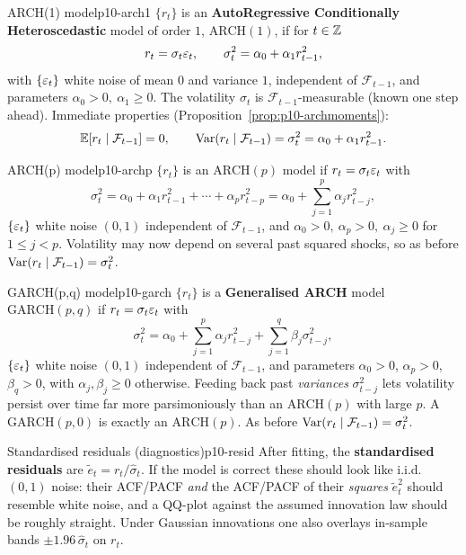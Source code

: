 \begin{definition}{ARCH(1) model}{p10-arch1}
$\{r_t\}$ is an \textbf{AutoRegressive Conditionally Heteroscedastic} model of
order $1$, $\mathrm{ARCH}(1)$, if for $t\in\mathbb{Z}$
\[
r_t=\sigma_t\varepsilon_t,\qquad \sigma_t^2=\alpha_0+\alpha_1 r_{t-1}^2,
\]
with $\{\varepsilon_t\}$ white noise of mean $0$ and variance $1$, independent of
$\mathcal F_{t-1}$, and parameters $\alpha_0>0,\ \alpha_1\ge 0$. The volatility
$\sigma_t$ is $\mathcal F_{t-1}$-measurable (known one step ahead). Immediate
properties (Proposition~\ref{prop:p10-archmoments}):
\[
\mathbb{E}[r_t\mid\mathcal F_{t-1}]=0,\qquad
\operatorname{Var}(r_t\mid\mathcal F_{t-1})=\sigma_t^2=\alpha_0+\alpha_1 r_{t-1}^2 .
\]
\end{definition}

\begin{definition}{ARCH(p) model}{p10-archp}
$\{r_t\}$ is an $\mathrm{ARCH}(p)$ model if $r_t=\sigma_t\varepsilon_t$ with
\[
\sigma_t^2=\alpha_0+\alpha_1 r_{t-1}^2+\cdots+\alpha_p r_{t-p}^2
=\alpha_0+\sum_{j=1}^{p}\alpha_j r_{t-j}^2,
\]
$\{\varepsilon_t\}$ white noise $(0,1)$ independent of $\mathcal F_{t-1}$, and
$\alpha_0>0,\ \alpha_p>0,\ \alpha_j\ge0$ for $1\le j<p$. Volatility may now
depend on several past squared shocks, so as before
$\operatorname{Var}(r_t\mid\mathcal F_{t-1})=\sigma_t^2$.
\end{definition}

\begin{definition}{GARCH(p,q) model}{p10-garch}
$\{r_t\}$ is a \textbf{Generalised ARCH} model $\mathrm{GARCH}(p,q)$ if
$r_t=\sigma_t\varepsilon_t$ with
\[
\sigma_t^2=\alpha_0+\sum_{j=1}^{p}\alpha_j r_{t-j}^2+\sum_{j=1}^{q}\beta_j\sigma_{t-j}^2,
\]
$\{\varepsilon_t\}$ white noise $(0,1)$ independent of $\mathcal F_{t-1}$, and parameters
$\alpha_0>0$, $\alpha_p>0$, $\beta_q>0$, with $\alpha_j,\beta_j\ge0$ otherwise.
Feeding back past \emph{variances} $\sigma_{t-j}^2$ lets volatility persist over
time far more parsimoniously than an $\mathrm{ARCH}(p)$ with large $p$. A
$\mathrm{GARCH}(p,0)$ is exactly an $\mathrm{ARCH}(p)$. As before
$\operatorname{Var}(r_t\mid\mathcal F_{t-1})=\sigma_t^2$.
\end{definition}

\begin{definition}{Standardised residuals (diagnostics)}{p10-resid}
After fitting, the \textbf{standardised residuals} are
$\tilde e_t=r_t/\hat\sigma_t$. If the model is correct these should look like
i.i.d.\ $(0,1)$ noise: their ACF/PACF \emph{and} the ACF/PACF of their
\emph{squares} $\tilde e_t^2$ should resemble white noise, and a QQ-plot against
the assumed innovation law should be roughly straight. Under Gaussian
innovations one also overlays in-sample bands $\pm1.96\,\hat\sigma_t$ on $r_t$.
\end{definition}

